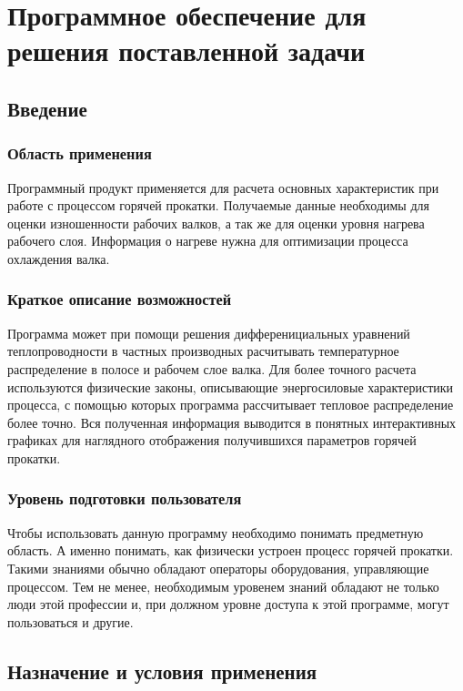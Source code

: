 \section{Программное обеспечение для решения поставленной задачи}

\subsection{Введение}

\subsubsection{Область применения}
Программный продукт применяется для расчета основных характеристик при работе с процессом горячей прокатки. Получаемые данные необходимы для оценки изношенности рабочих валков, а так же для оценки уровня нагрева рабочего слоя. Информация о нагреве нужна для оптимизации процесса охлаждения валка.

\subsubsection{Краткое описание возможностей}
Программа может при помощи решения дифференициальных уравнений теплопроводности в частных производных расчитывать температурное распределение в полосе и рабочем слое валка. Для более точного расчета используются физические законы, описывающие энергосиловые характеристики процесса, с помощью которых программа рассчитывает тепловое распределение более точно. Вся полученная информация выводится в понятных интерактивных графиках для наглядного отображения получившихся параметров горячей прокатки.

\subsubsection{Уровень подготовки пользователя}
Чтобы использовать данную программу необходимо понимать предметную область. А именно понимать, как физически устроен процесс горячей прокатки. Такими знаниями обычно обладают операторы оборудования, управляющие процессом. Тем не менее, необходимым уровенем знаний обладают не только люди этой профессии и, при должном уровне доступа к этой программе, могут пользоваться и другие.

\subsection{Назначение и условия применения}

